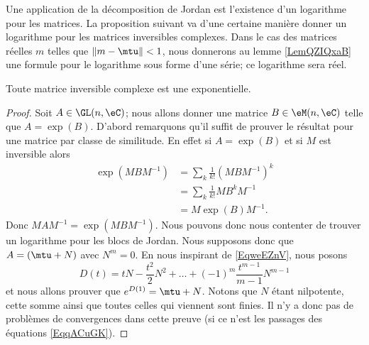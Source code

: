 Une application de la décomposition de Jordan est l'existence d'un logarithme pour les matrices. La proposition suivant va d'une certaine manière donner un logarithme pour les matrices inversibles complexes. Dans le cas des matrices réelles \( m\) telles que \( \| m-\mtu \|<1\), nous donnerons au lemme \ref{LemQZIQxaB} une formule pour le logarithme sous forme d'une série; ce logarithme sera réel.
\begin{proposition} \label{PropKKdmnkD}
    Toute matrice inversible complexe est une exponentielle.
\end{proposition}

\begin{proof}
    Soit \( A\in \GL(n,\eC)\); nous allons donner une matrice \( B\in \eM(n,\eC)\) telle que \( A=\exp(B)\). D'abord remarquons qu'il suffit de prouver le résultat pour une matrice par classe de similitude. En effet si \( A=\exp(B)\) et si \( M\) est inversible alors 
    \begin{subequations}    \label{EqqACuGK}
        \begin{align}
            \exp(MBM^{-1})&=\sum_k\frac{1}{ k! }(MBM^{-1})^k\\
            &=\sum_k\frac{1}{ k! }MB^kM^{-1}\\
            &=M\exp(B)M^{-1}.
        \end{align}
    \end{subequations}
    Donc \( MAM^{-1}=\exp(MBM^{-1})\). Nous pouvons donc nous contenter de trouver un logarithme pour les blocs de Jordan. Nous supposons donc que \( A=(\mtu+N)\) avec \( N^m=0\). En nous inspirant de \eqref{EqweEZnV}, nous posons
    \begin{equation}
        D(t)=tN-\frac{ t^2 }{ 2 }N^2+\ldots +(-1)^m\frac{ t^{m-1} }{ m-1 }N^{m-1}
    \end{equation}
    et nous allons prouver que \(  e^{D(1)}=\mtu+N\). Notons que \( N\) étant nilpotente, cette somme ainsi que toutes celles qui viennent sont finies. Il n'y a donc pas de problèmes de convergences dans cette preuve (si ce n'est les passages des équations \eqref{EqqACuGK}).


\end{proof}
